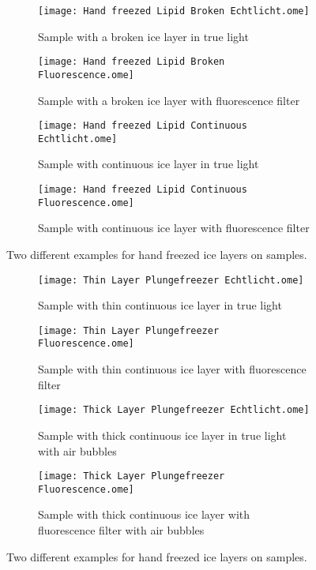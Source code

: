 \begin{figure}[hbt!]
	\centering
	\begin{subfigure}[]{0.45\textwidth}
		\centering
		\texttt{[image: Hand freezed Lipid Broken Echtlicht.ome]}
		\caption{Sample with a broken ice layer in true light \newline}
	\end{subfigure}
	\begin{subfigure}[]{0.45\textwidth}
		\centering
		\texttt{[image: Hand freezed Lipid Broken Fluorescence.ome]}
		\caption{Sample with a broken ice layer with fluorescence filter}
	\end{subfigure}
	\begin{subfigure}[]{0.45\textwidth}
		\centering
		\texttt{[image: Hand freezed Lipid Continuous Echtlicht.ome]}
		\caption{Sample with continuous ice layer in true light \newline}
	\end{subfigure}
	\begin{subfigure}[]{0.45\textwidth}
		\centering
		\texttt{[image: Hand freezed Lipid Continuous Fluorescence.ome]}
		\caption{Sample with continuous ice layer with fluorescence filter}
	\end{subfigure}
	\caption{Two different examples for hand freezed ice layers on samples. }
	\label{fig:VglHandFreeze}
\end{figure}

\begin{figure}[hbt!]
	\centering
	\begin{subfigure}[]{0.45\textwidth}
		\centering
		\texttt{[image: Thin Layer Plungefreezer Echtlicht.ome]}
		\caption{Sample with thin continuous ice layer in true light \newline}
	\end{subfigure}
	\begin{subfigure}[]{0.45\textwidth}
		\centering
		\texttt{[image: Thin Layer Plungefreezer Fluorescence.ome]}
		\caption{Sample with thin continuous ice layer with fluorescence filter}
	\end{subfigure}
	\begin{subfigure}[]{0.45\textwidth}
		\centering
		\texttt{[image: Thick Layer Plungefreezer Echtlicht.ome]}
		\caption{Sample with thick continuous ice layer in true light with air bubbles}
	\end{subfigure}
	\begin{subfigure}[]{0.45\textwidth}
		\centering
		\texttt{[image: Thick Layer Plungefreezer Fluorescence.ome]}
		\caption{Sample with thick continuous ice layer with fluorescence filter with air bubbles}
	\end{subfigure}
	\caption{Two different examples for hand freezed ice layers on samples. }
	\label{fig:VglMachineFreeze}
\end{figure}

